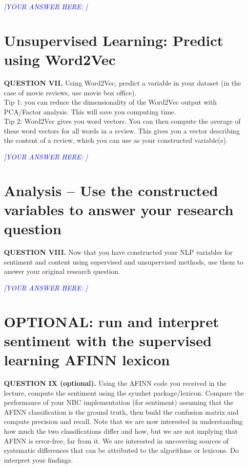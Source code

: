 \documentclass[11pt]{article}
\newcommand{\question}[2]{%
  \par\medskip
  \noindent\textbf{QUESTION #1.} #2\par\medskip
}
\newcommand{\answer}[1]{%
  \textcolor{blue}{\emph{[YOUR ANSWER HERE: #1]}}
}
\begin{document}
\answer{}


\section{Unsupervised Learning: Predict using Word2Vec}
\question{VII}{Using Word2Vec, predict a variable in your dataset (in the case of movie reviews, use movie box office).\\
Tip 1: you can reduce the dimensionality of the Word2Vec output with PCA/Factor
analysis. This will save you computing time.\\
Tip 2: Word2Vec gives you word vectors. You can then compute the average of these
word vectors for all words in a review. This gives you a vector describing the
content of a review, which you can use as your constructed variable(s).}

\answer{}


\section{Analysis -- Use the constructed variables to answer your research question}
\question{VIII}{Now that you have constructed your NLP variables for sentiment and
content using supervised and unsupervised methods, use them to answer your original
research question.}

\answer{}

\section{OPTIONAL: run and interpret sentiment with the supervised learning AFINN lexicon}
\question{IX (optional)}{Using the AFINN code you received in the lecture, compute
the sentiment using the syuzhet package/lexicon. Compare the performance of your NBC
implementation (for sentiment) assuming that the AFINN classification is the ground
truth, then build the confusion matrix and compute precision and recall. Note that we
are now interested in understanding how much the two classifications differ and how,
but we are not implying that AFINN is error-free, far from it. We are interested in
uncovering sources of systematic differences that can be attributed to the algorithms
or lexicons. Do interpret your findings.}
\end{document}
